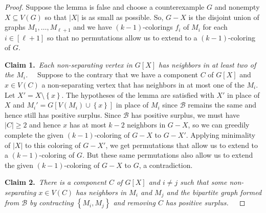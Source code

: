 \documentclass[12pt]{article}
\theoremstyle{plain}
\theoremstyle{definition}
\theoremstyle{remark}
\newcommand{\fancy}[1]{\mathcal{#1}}
\newcommand{\B}{\fancy{B}}
\newcommand{\set}[1]{\left\{ #1 \right\}}
\newcommand{\irange}[1]{\left[#1\right]}
\newcommand{\claim}[2]{{\bf Claim #1.}~{\it #2}~~}
\begin{document}
\begin{proof}
Suppose the lemma is false and choose a counterexample $G$ and nonempty $X \subseteq V(G)$ so that $|X|$ is as small as possible.  So, $G-X$ is the disjoint union of graphs $M_1, \ldots, M_{\ell + 1}$ and we have $(k-1)$-colorings $f_i$ of $M_i$ for each $i \in \irange{\ell + 1}$ so that no permutations allow us to extend to a $(k - 1)$-coloring of $G$.

\claim{1}{Each non-separating vertex in $G[X]$ has neighbors in at least two of the $M_i$.}
Suppose to the contrary that we have a component $C$ of $G[X]$ and $x \in V(C)$ a non-separating vertex that has neighbors in at most one of the $M_i$.  Let $X' = X \setminus \set{x}$.  The hypotheses of the lemma are satisfied with $X'$ in place of $X$ and $M_i' = G[V(M_i) \cup \set{x}]$ in place of $M_i$ since $\B$ remains the same and hence still has positive surplus. Since $\B$ has positive surplus, we must have $|C| \ge 2$ and hence $x$ has at most $k-2$ neighbors in $G-X$, so we can greedily complete the given $(k-1)$-coloring of $G-X$ to $G-X'$. Applying minimality of $|X|$ to this coloring of $G-X'$, we get permutations that allow us to extend to a $(k - 1)$-coloring of $G$.  But these same permutations also allow us to extend the given $(k-1)$-coloring of $G-X$ to $G$, a contradiction.

\claim{2}{There is a component $C$ of $G[X]$ and $i \ne j$ such that some non-separating $x \in V(C)$ has neighbors in $M_i$ and $M_j$ and the bipartite graph formed from $\B$ by contracting $\set{M_i, M_j}$ and removing $C$ has positive surplus.}


\end{proof}
\end{document}
